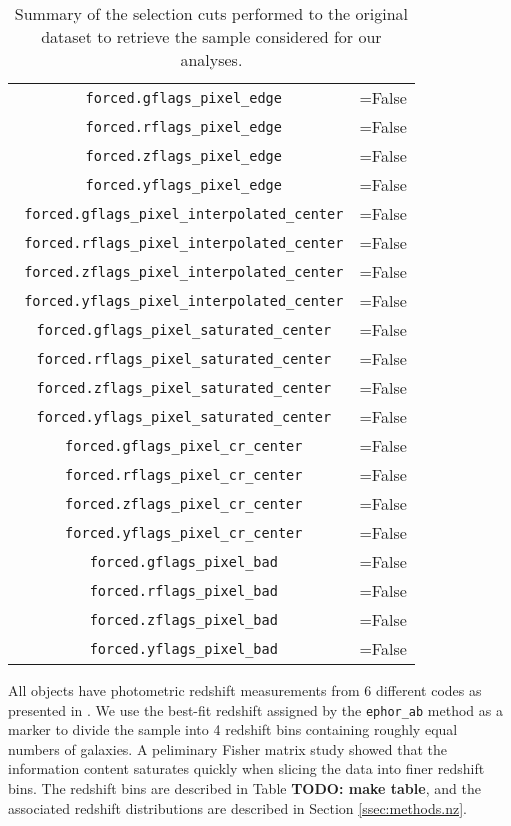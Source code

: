 \documentclass[a4paper,11pt]{article}
\newcommand{\todo}[1]{{\bf TODO: #1}}
\begin{document}
\begin{table}
\begin{tabular}{|c|c|}
   \texttt{ forced.gflags\_pixel\_edge} & =False\\
   \texttt{ forced.rflags\_pixel\_edge} & =False\\
   \texttt{ forced.zflags\_pixel\_edge} & =False\\
   \texttt{ forced.yflags\_pixel\_edge} & =False\\
   \texttt{ forced.gflags\_pixel\_interpolated\_center} & =False\\
   \texttt{ forced.rflags\_pixel\_interpolated\_center} & =False\\
   \texttt{ forced.zflags\_pixel\_interpolated\_center} & =False\\
   \texttt{ forced.yflags\_pixel\_interpolated\_center} & =False\\
   \texttt{ forced.gflags\_pixel\_saturated\_center} & =False\\
   \texttt{ forced.rflags\_pixel\_saturated\_center} & =False\\
   \texttt{ forced.zflags\_pixel\_saturated\_center} & =False\\
   \texttt{ forced.yflags\_pixel\_saturated\_center} & =False\\
   \texttt{ forced.gflags\_pixel\_cr\_center} & =False\\
   \texttt{ forced.rflags\_pixel\_cr\_center} & =False\\
   \texttt{ forced.zflags\_pixel\_cr\_center} & =False\\
   \texttt{ forced.yflags\_pixel\_cr\_center} & =False\\
   \texttt{ forced.gflags\_pixel\_bad} & =False\\
   \texttt{ forced.rflags\_pixel\_bad} & =False\\
   \texttt{ forced.zflags\_pixel\_bad} & =False\\
   \texttt{ forced.yflags\_pixel\_bad} & =False\\
 \hline
 \end{tabular}
 \caption{Summary of the selection cuts performed to the original dataset to retrieve the sample considered for our analyses.}
 \label{tab:cuts_summary}
 \end{table}  
 
 
  All objects have photometric redshift measurements from 6 different codes as presented in \citet{2018PASJ...70S...9T}. We use the best-fit redshift assigned by the {\tt ephor\_ab} method as a marker to divide the sample into 4 redshift bins containing roughly equal numbers of galaxies. A peliminary Fisher matrix study showed that the information content saturates quickly when slicing the data into finer redshift bins. The redshift bins are described in Table \todo{make table}, and the associated redshift distributions are described in Section \ref{ssec:methods.nz}.
\end{document}
